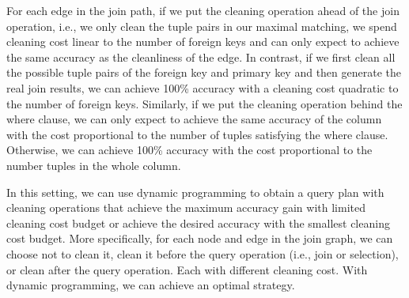 For each edge in the join path, if we put the cleaning operation ahead of the join operation, i.e., we only clean the tuple pairs in our maximal matching, we spend cleaning cost linear to the number of foreign keys and can only expect to achieve the same accuracy  as the cleanliness of the edge. In contrast, if we first clean all the possible tuple pairs of the foreign key and primary key and then generate the real join results, we can achieve 100\% accuracy with a cleaning cost quadratic to the number of foreign keys. Similarly, if we put the cleaning operation behind the where clause, we can only expect to achieve the same accuracy of the column with the cost proportional to the number of tuples satisfying the where clause. Otherwise, we can achieve 100\% accuracy with the cost proportional to the number tuples in the whole column.


In this setting, we can use dynamic programming to obtain a query plan with cleaning operations that achieve the maximum accuracy gain with limited cleaning cost budget or achieve the desired accuracy with the smallest cleaning cost budget. More specifically, for each node and edge in the join graph, we can choose not to clean it, clean it before the query operation (i.e., join or selection), or clean after the query operation. Each with different cleaning cost. With dynamic programming, we can achieve an optimal strategy.
\fi

